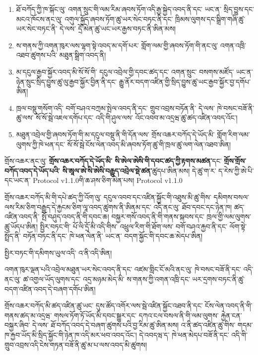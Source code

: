 \documentclass[11pt]{article}
\begin{document}
\begin{enumerate}[leftmargin=*]
\item ཐོ་བཀོད་ཀྱི་ཁ་སྐོང་ལུ་ འགན་སྲུང་གི་ལམ་རིམ་ཞབས་ཏོག་འདི་རྒྱ་སྐྱེད་འབད་ནི་དང་ ཡང་ན་ སྲིད་བྱུས་དང་མངའ་ཁོངས་ནང་ལུ་ འགུལ་སྐྱོད་ཞབས་ཏོག་ཚུ་ཡར་སེང་བཏང་ནི་དང་ ཁྲིམས་ལུགས་དང་སྒྲིག་གཞི་ཚུ་ཡར་སེང་བཏང་ནི་ དེ་ལས་ དྲོ་མེན་ཚུ་ཡང་ཡར་རྒྱས་བཏང་ནི་ཨིན་མས།
\item ས་གནས་ཀྱི་འགན་ཁུར་ལས་ལྷག་སྟེ་འབད་མ་དགོ་པར་ གློག་ལམ་གྱི་ཞབས་ཏོག་གི་ནང་ལུ་ འགན་འཁྲི་འཐབ་ཚུགས་པའི་ མཐུན་སྒྲིག་འབད་ནི།
\item མ་དངུལ་རྒྱབ་སྐྱོར་འབད་མི་སོ་སོ་གི་ དངུལ་འབྲེལ་གྱི་དབང་ཚད་དང་ འགན་སྲུང་ བསགས་མཛོད་ ཡང་ན་ ཉེན་སྲུང་སྲིད་བྱུས་ཚུ་ལུ་རྒྱབ་སྐྱོར་བྱིན་ནི་དང་ རྒྱུ་ནོར་བདག་འཛིན་གྱི་སྲིད་བྱུས་ཚུ་ཡང་རྒྱབ་སྐྱོར་བྱ་དགོཔ་ཨིན།
\item ཁྲལ་བསྡུ་གསོག་འདི་ བགོ་བཤའ་བཀྲམ་སྤེལ་འབད་ནི་དང་ གྲུབ་འབྲས་བཏོན་ནི་ དེ་ལས་ ཁེ་བསང་བཟོ་ནི་ཚུ་ལས་ སོ་སོ་སྦེ་འཇལ་དགོཔ་དང་ འདི་གི་ཤུལ་ལས་ འོང་འབབ་མ་འདྲཝ་ཚུ་ཚད་འཛིན་འབད་འོང་།
\item མཐུན་འབྲེལ་གྱི་ཞབས་ཏོག་གི་མ་དངུལ་བསྡུ་ནི་གི་དོན་ལས་ གྲོས་འཆར་བཀོད་དེ་ཡོད་མི་ གློག་རིག་ལམ་ལུགས་ཀྱི་ཁེ་ཕན་དང་ སོ་སོ་སྦེ་ངོས་ལེན་འབད་མི་ཞབས་ཏོག་ཚུ་གི་ཁྲལ་ཚུ་ལག་ལེན་འཐབ་ཨིན།
\end{enumerate}
གྲོས་འཆར་ནང་ལུ་ \textbf{གྲོས་འཆར་བཀོད་དེ་ཡོད་མི་ སི་ཨེལ་ཨེསི་གི་དབང་ཚད་ཀྱི་རྟགས་མཚན་}དང་ \textbf{གྲོས་གྲོས་བཀོད་འབད་དེ་ཡོད་པའི་ སི་ཨཱལ་ཨེ་སི་ཨེསི་བརྒྱུད་འབྲེལ་སྡེ་ཚན་}ཚུདཔ་ཨིན་མས། དེ་ཚུ་ག་ར་ ད་རེས་ཀྱི་ཨེ་པི་དང་ཡང་ན་ Protocol v1.1.0གི་ཆ་ཤས་ཅིག་མེན་པས། Protocol v1.1.0

གྲོས་འཆར་བཀོད་མི་གི་དཔེ་ཚད་ཀྱི་འོག་ལུ་ དངུལ་འབབ་དང་འཛིན་སྐྱོང་གི་འཐུས་མི་ཚུ་གིས་ དམིགས་བསལ་ལས་རིམ་ཅིག་བརྒྱུད་དེ་རྐྱངམ་ཅིག་ལཱ་འབད་ཚུགས་ནི་ཨིནམ་དང་ འདི་ནང་ལུ་ ཐོབ་དབང་དང་ཉེན་ཁ། ཚད་འཛིན་འབད་ནི་ སྤོ་བཤུད་འབད་ནི་གི་དབང་ཆ། བསྐྱར་གསོ་འབད་ནི་གི་གནས་སྐབས་དང་ ཁྲལ་གྱི་ལམ་ལུགས་ཚུ་ཡོདཔ་ཨིན། སྤྱིར་བཏང་གི་ པོ་ལི་དྲོ་མི་འདི་གིས་ འཕྲུལ་རིག་གི་ཐོག་ལས་ བགོ་བཤའ་རྐྱབ་ནི་དང་ ལོག་སྟེ་སྤྲོད་ནི་ བཏོན་བཏང་ནི་དང་ ཁེ་ཕན་ལེན་ནི་ ཡང་ན་ བདག་སྐྱོང་གི་དབང་ཆ་མེདཔ་ཨིན།

སྤྱིར་བཏང་གི་དམིགས་ཡུལ་འདི་ འ་ནི་འདི་ཨིན།

འགན་ཁུར་ལྡན་པའི་འབྲེལ་མཐུན་ཡར་སེང་འབད་ནི་དང་ འཛམ་གླིང་ངོ་མའི་ནང་ལུ་ ཁེ་བསང་བཟོ་ནི་དང་ འདི་ནང་ལུ་ ཚ་འགྱལ་ཡོད་ལུགས་དང་ འདྲ་མཉམ་མེད་མི་ ས་གནས་ཀྱི་འགན་འཁྲི་དང་ ཡར་དྲགས་བཏང་ནི་ཚུ་ བདག་འཛིན་འབད་དེ་བཞག་དགོཔ་ཨིན།

གྲོས་འཆར་བཀོད་མི་ཚད་འཛིན་ཚུ་ཡང་ དུས་ཚོད་འགོར་ལས་སྦེ་འཛིན་སྐྱོང་འཐབ་ནི་དང་ ངོས་ལེན་འབད་ནི་གི་གནས་ཚད་མ་འདྲཝ་ གསལ་ཏོག་ཏོ་ཡོད་མི་དབང་སྒྱུར་དང་ དཀའ་ངལ་བསལ་ནི་གི་ལམ་ལུགས་ རྐྱེན་ངན་བསྐྱར་ཞིབ་ དེ་ལས་ ཐོ་བཀོད་འབད་དེ་བཞག་ཚུགས་པའི་བྱ་རིམ་ཚུ་ཨིན་མས། འ་ནི་ཚད་འཛིན་ཚུ་གིས་ གདམ་ཁ་རྐྱབ་ཡོད་མི་སྲིད་སྐྱོང་གི་ཉེན་ཁ་འདི་མར་ཕབ་འབད་འོང་། དེ་འབདཝ་ད་ ཁེ་ཕན་མེདཔ་བཟོ་ནི་དང་ འདི་གི་གྲུབ་འབྲས་འདི་ངེས་གཏན་བཟོ་ནི་ཚུ་མ་པ་ལས་འབད་མི་ཚུགས།
\end{document}
